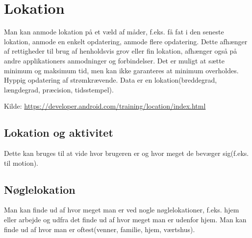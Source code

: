 \section{Lokation}
Man kan anmode lokation på et væld af måder, f.eks. få fat i den seneste lokation, anmode en enkelt opdatering, anmode flere opdatering. 
Dette afhænger af rettigheder til brug af henholdsvis grov eller fin lokation, afhænger også på andre applikationers anmodninger og forbindelser. Det er muligt at sætte minimum og maksimum tid, men kan ikke garanteres at minimum overholdes. Hyppig opdatering af strømkrævende. 
Data er en lokation(breddegrad, længdegrad, præcision, tidsstempel).

Kilde: \url{https://developer.android.com/training/location/index.html}

\subsection{Lokation og aktivitet}
Dette kan bruges til at vide hvor brugeren er og hvor meget de bevæger sig(f.eks. til motion).

\subsection{Nøglelokation}
Man kan finde ud af hvor meget man er ved nogle nøglelokationer, f.eks. hjem eller arbejde og udfra det finde ud af hvor meget man er udenfor hjem. Man kan finde ud af hvor man er oftest(venner, familie, hjem, værtshus).


